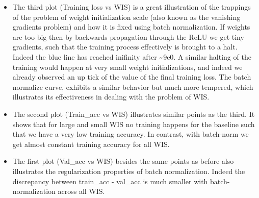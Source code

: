 \documentclass[11pt]{article}
\providecommand{\tightlist}{%
      \setlength{\itemsep}{0pt}\setlength{\parskip}{0pt}}
\begin{document}
\begin{itemize}
\tightlist
\item
  The third plot (Training loss vs WIS) is a great illustration of the
  trappings of the problem of weight initialization scale (also known as
  the vanishing gradients problem) and how it is fixed using batch
  normalization. If weights are too big then by backwards propagation
  through the ReLU we get tiny gradients, such that the training process
  effectively is brought to a halt. Indeed the blue line has reached
  inifinity after \textasciitilde{}9e0. A similar halting of the
  training would happen at very small weight initializations, and indeed
  we already observed an up tick of the value of the final training
  loss. The batch normalize curve, exhibits a similar behavior but much
  more tempered, which illustrates its effectiveness in dealing with the
  problem of WIS.
\item
  The second plot (Train\_acc vs WIS) illustrates similar points as the
  third. It shows that for large and small WIS no training happens for
  the baseline such that we have a very low training accuracy. In
  contrast, with batch-norm we get almost constant training accuracy for
  all WIS.
\item
  The first plot (Val\_acc vs WIS) besides the same points as before
  also illustrates the regularization properties of batch normalization.
  Indeed the discrepancy between train\_acc - val\_acc is much smaller
  with batch-normalization across all WIS.
\end{itemize}


    
    
    
    
\end{document}
